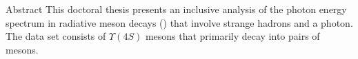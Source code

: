 \begin{abstractpage}{Abstract}
    This doctoral thesis presents an inclusive analysis of the photon energy spectrum in radiative \B meson decays (\BtoXsgamma) that involve strange hadrons and a photon.
    The data set consists of $\Upsilon(4S)$ mesons that primarily decay into pairs of \B mesons.

\end{abstractpage}

